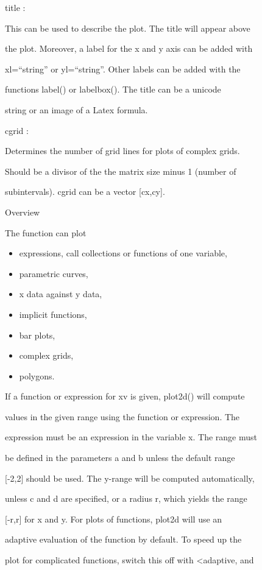 \documentclass[
]{book}
\begin{document}
title :

This can be used to describe the plot. The title will appear above

the plot. Moreover, a label for the x and y axis can be added with

xl=``string'' or yl=``string''. Other labels can be added with the

functions label() or labelbox(). The title can be a unicode

string or an image of a Latex formula.

cgrid :

Determines the number of grid lines for plots of complex grids.

Should be a divisor of the the matrix size minus 1 (number of

subintervals). cgrid can be a vector {[}cx,cy{]}.

Overview

The function can plot

\begin{itemize}
\item
  expressions, call collections or functions of one variable,
\item
  parametric curves,
\item
  x data against y data,
\item
  implicit functions,
\item
  bar plots,
\item
  complex grids,
\item
  polygons.
\end{itemize}

If a function or expression for xv is given, plot2d() will compute

values in the given range using the function or expression. The

expression must be an expression in the variable x. The range must

be defined in the parameters a and b unless the default range

{[}-2,2{]} should be used. The y-range will be computed automatically,

unless c and d are specified, or a radius r, which yields the range

{[}-r,r{]} for x and y. For plots of functions, plot2d will use an

adaptive evaluation of the function by default. To speed up the

plot for complicated functions, switch this off with \textless adaptive, and
\end{document}
